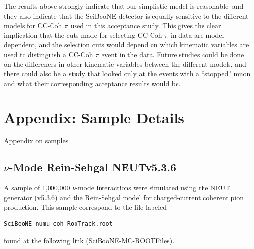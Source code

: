 \documentclass[11pt]{article}
\begin{document}
The results above strongly indicate that our simplistic model is reasonable, and they also indicate that the SciBooNE detector is equally sensitive to the different models for CC-Coh $\pi$ used in this acceptance study. This gives the clear implication that the cuts made for selecting CC-Coh $\pi$ in data are model dependent, and the selection cuts would depend on which kinematic variables are used to distinguish a CC-Coh $\pi$ event in the data. Future studies could be done on the differences in other kinematic variables between the different models, and there could also be a study that looked only at the events with a ``stopped'' muon and what their corresponding acceptance results would be.


%
\newpage

\appendix


\section{Appendix: Sample Details}
\label{sec:SampleAppendix}

Appendix on samples

\subsection{$\nu$-Mode Rein-Sehgal NEUTv5.3.6}
\label{sub:NMRSv5.3.6}
A sample of 1,000,000 $\nu$-mode interactions were simulated using the NEUT generator (v5.3.6) and the Rein-Sehgal model for charged-current coherent pion production. This sample correspond to the file labeled 
\begin{verbatim}
SciBooNE_numu_coh_RooTrack.root
\end{verbatim}
found at the following link (\href{https://drive.google.com/open?id=0B4rvJl9swUOxcEtpSl94RDRsc3c}{SciBooNE-MC-ROOTFiles}).
\end{document}
